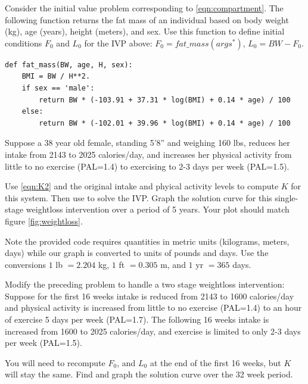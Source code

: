\begin{problem}

Consider the initial value problem corresponding to \eqref{eqn:compartment}.
The following function returns the fat mass of an individual based on body weight (kg), age (years), height (meters), and sex. Use this function to define initial conditions $F_0$ and $L_0$ for the IVP above: $F_0= fat\_mass(args^*)$, $L_0 = BW - F_0$.%
\begin{lstlisting}
def fat_mass(BW, age, H, sex):
    BMI = BW / H**2.
    if sex == 'male':
        return BW * (-103.91 + 37.31 * log(BMI) + 0.14 * age) / 100
    else:
        return BW * (-102.01 + 39.96 * log(BMI) + 0.14 * age) / 100
\end{lstlisting}

Suppose a 38 year old female, standing 5'8'' and weighing 160 lbs, reduces her intake from 2143 to 2025 calories/day, and increases her physical activity from little to no exercise (PAL=1.4) to exercising to 2-3 days per week (PAL=1.5).

Use \eqref{eqn:K2} and the original intake and phyical activity levels to compute $K$ for this system. Then use  to solve the IVP. Graph the solution curve for this single-stage weightloss intervention over a period of 5 years. Your plot should match figure \ref{fig:weightloss}.

Note the provided code requires quantities in metric units (kilograms, meters, days) while our graph is converted to units of pounds and days.
Use the conversions $1$ lb $=2.204$ kg, $1$ ft $=0.305$ m, and $1$ yr $=365$ days.
\end{problem}

\begin{problem}
Modify the preceding problem to handle a two stage weightloss intervention:
Suppose for the first 16 weeks intake is reduced from 2143 to 1600 calories/day and physical activity is increased from little to no exercise (PAL=1.4) to an hour of exercise 5 days per week (PAL=1.7).
The following 16 weeks intake is increased from 1600 to 2025 calories/day, and exercise is limited to only 2-3 days per week (PAL=1.5).

You will need to recompute $F_0$, and $L_0$ at the end of the first 16 weeks, but $K$ will stay the same. 
Find and graph the solution curve over the 32 week period.
\end{problem}

